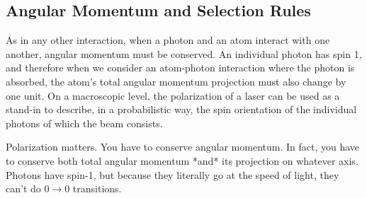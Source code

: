 %

\subsection{Angular Momentum and Selection Rules}


As in any other interaction, when a photon and an atom interact with one another, angular momentum must be conserved.
An individual photon has spin 1, and therefore when we consider an atom-photon interaction where the photon is absorbed, the atom's total angular momentum projection  must also change by one unit.
On a macroscopic level, the polarization of a laser can be used as a stand-in to describe, in a probabilistic way, the spin orientation of the individual photons of which the beam consists.  

Polarization matters.  You have to conserve angular momentum.  In fact, you have to conserve both total angular momentum *and* its projection on whatever axis.  Photons have spin-1, but because they literally go at the speed of light, they can't do $0 \rightarrow 0$ transitions.  

